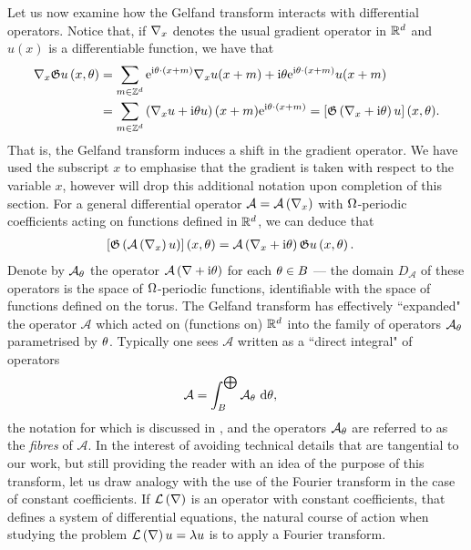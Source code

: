 Let us now examine how the Gelfand transform interacts with differential operators.
Notice that, if $\nabla_x$ denotes the usual gradient operator in $\mathbb{R}^d$ and $u(x)$ is a differentiable function, we have that
\begin{align*}
	\nabla_x\mathfrak{G} u\left( x,\theta \right) 
	&= \sum_{m\in\mathbb{Z}^d} \mathrm{e}^{\mathrm{i}\theta\cdot\left( x+m \right)}\nabla_x u(x+m) + \mathrm{i}\theta\mathrm{e}^{\mathrm{i}\theta\cdot\left( x+m \right)}u(x+m) \\
	&= \sum_{m\in\mathbb{Z}^d} \left( \nabla_x u + \mathrm{i}\theta u \right)(x+m)\mathrm{e}^{\mathrm{i}\theta\cdot\left( x+m \right)}
	= \left[ \mathfrak{G}\left( \nabla_x+\mathrm{i}\theta \right)u \right](x,\theta).
\end{align*}
That is, the Gelfand transform induces a shift in the gradient operator.
We have used the subscript $x$ to emphasise that the gradient is taken with respect to the variable $x$, however will drop this additional notation upon completion of this section.
For a general differential operator $\mathcal{A} = \mathcal{A}\left( \nabla_x \right)$ with $\Omega$-periodic coefficients acting on functions defined in $\mathbb{R}^d$, we can deduce that
\begin{align*}
	\left[ \mathfrak{G}\left( \mathcal{A}\left( \nabla_x \right)u \right) \right](x,\theta) 
	&= \mathcal{A}\left( \nabla_x + \mathrm{i}\theta \right)\mathfrak{G} u\left( x,\theta \right).
\end{align*}
Denote by $\mathcal{A}_{\theta}$ the operator $\mathcal{A}\left( \nabla+\mathrm{i}\theta \right)$ for each $\theta\in B$ --- the domain $D_{\mathcal{A}}$ of these operators is the space of $\Omega$-periodic functions, identifiable with the space of functions defined on the torus.
The Gelfand transform has effectively ``expanded" the operator $\mathcal{A}$ which acted on (functions on) $\mathbb{R}^d$ into the family of operators $\mathcal{A}_{\theta}$ parametrised by $\theta$.
Typically one sees $\mathcal{A}$ written as a ``direct integral" of operators
\begin{align*}
	\mathcal{A} &= \int_{B}^{\bigoplus}\mathcal{A}_{\theta} \ \mathrm{d}\theta,
\end{align*}
the notation for which is discussed in \cite{reed1978iv}, and the operators $\mathcal{A}_{\theta}$ are referred to as the \emph{fibres} of $\mathcal{A}$.
In the interest of avoiding technical details that are tangential to our work, but still providing the reader with an idea of the purpose of this transform, let us draw analogy with the use of the Fourier transform in the case of constant coefficients.
If $\mathcal{L}\left( \nabla \right)$ is an operator with constant coefficients, that defines a system of differential equations, the natural course of action when studying the problem $\mathcal{L}\left( \nabla \right)u=\lambda u$ is to apply a Fourier transform.
